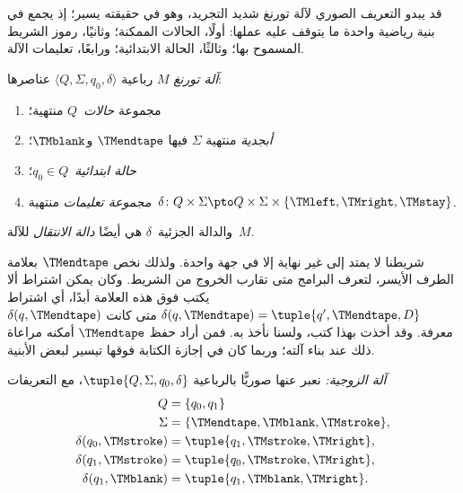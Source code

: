 \documentclass[../../../include/open-logic-section]{subfiles}
\begin{document}

\begin{explain}
قد يبدو التعريف الصوري لآلة تورنغ شديد التجريد، وهو في حقيقته يسير؛ إذ يجمع في بنية رياضية واحدة ما يتوقف عليه عملها: أولًا، الحالات الممكنة؛ وثانيًا، رموز الشريط المسموح بها؛ وثالثًا، الحالة الابتدائية؛ ورابعًا، تعليمات الآلة.
\end{explain}

\begin{defn}
\emph{آلة تورنغ} $M$ رباعية $\langle Q,\Sigma,q_0,\delta\rangle$ عناصرها:
\begin{enumerate}
\item مجموعة \emph{حالات}~$Q$ منتهية؛
\item \emph{أبجدية} منتهية $\Sigma$ فيها $\TMendtape$ و$\TMblank$؛
\item \emph{حالة ابتدائية}~$q_0 \in Q$؛
\item \emph{مجموعة تعليمات} منتهية~$\delta\colon Q \times \Sigma
  \pto Q \times \Sigma \times \{\TMleft,\TMright,\TMstay\}$.
\end{enumerate}
والدالة الجزئية~$\delta$ هي أيضًا \emph{دالة الانتقال} للآلة~$M$.
\end{defn}

\begin{explain}
شريطنا لا يمتد إلى غير نهاية إلا في جهة واحدة. ولذلك نخص $\TMendtape$ بعلامة الطرف الأيسر، لتعرف البرامج متى تقارب الخروج من الشريط. وكان يمكن اشتراط ألا يكتب فوق هذه العلامة أبدًا، أي اشتراط $\delta(q,\TMendtape)=\tuple{q',\TMendtape,D}$ متى كانت $\delta(q,\TMendtape)$ معرفة. وقد أخذت بهذا كتب، ولسنا نأخذ به. فمن أراد حفظ $\TMendtape$ أمكنه مراعاة ذلك عند بناء آلته؛ وربما كان في إجازة الكتابة فوقها تيسير لبعض الأبنية.
\end{explain}

\begin{ex}
\emph{آلة الزوجية:} نعبر عنها صوريًّا بالرباعية $\tuple{Q,\Sigma,q_0,\delta}$، مع التعريفات
\begin{align*}
Q & = \{ q_0, q_1 \} \\
\Sigma & = \{ \TMendtape, \TMblank, \TMstroke \}, \\
\delta(q_0, \TMstroke) & = \tuple{q_1, \TMstroke, \TMright},\\
\delta(q_1, \TMstroke) & = \tuple{q_0, \TMstroke, \TMright},\\
\delta(q_1, \TMblank)  & = \tuple{q_1, \TMblank, \TMright}.
\end{align*}
\end{ex}
\end{document}
